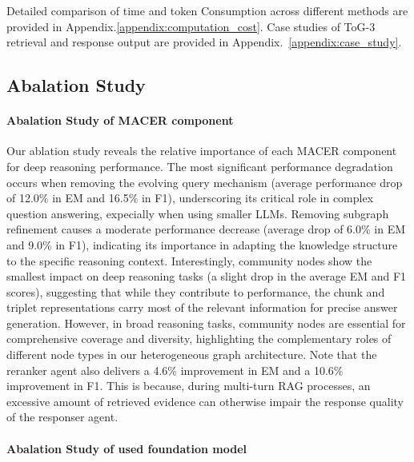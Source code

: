 Detailed comparison of time and token Consumption across different methods are provided in Appendix.\ref{appendix:computation_cost}.
Case studies of ToG-3 retrieval and response output are provided in Appendix.~\ref{appendix:case_study}.



\subsection{Abalation Study}

\paragraph{Abalation Study of MACER component}

Our ablation study reveals the relative importance of each MACER component for deep reasoning performance. The most significant performance degradation occurs when removing the evolving query mechanism (average performance drop of 12.0\% in EM and 16.5\% in F1), underscoring its critical role in complex question answering, expecially when using smaller LLMs. 
Removing subgraph refinement causes a moderate performance decrease (average drop of 6.0\% in EM and 9.0\% in F1), indicating its importance in adapting the knowledge structure to the specific reasoning context. Interestingly, community nodes show the smallest impact on deep reasoning tasks (a slight drop in the average EM and F1 scores), suggesting that while they contribute to performance, the chunk and triplet representations carry most of the relevant information for precise answer generation. 
However, in broad reasoning tasks, community nodes are essential for comprehensive coverage and diversity, highlighting the complementary roles of different node types in our heterogeneous graph architecture.
Note that the reranker agent also delivers a 4.6\% improvement in EM and a 10.6\% improvement in F1. This is because, during multi-turn RAG processes, an excessive amount of retrieved evidence can otherwise impair the response quality of the responser agent.


\paragraph{Abalation Study of used foundation model}

